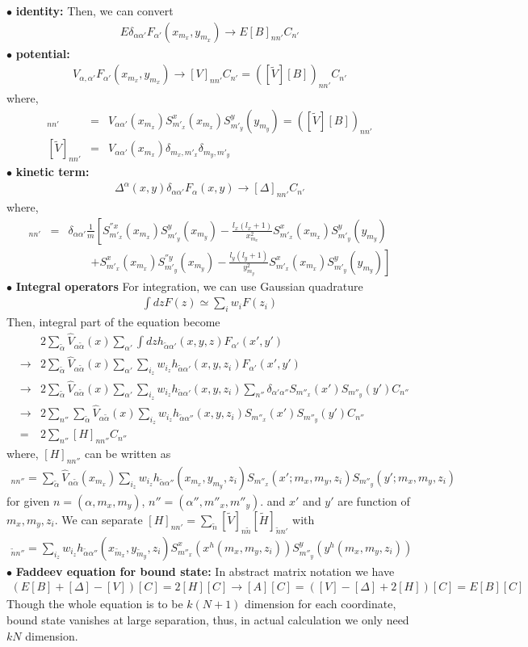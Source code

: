 \documentclass[11pt]{article}
\newcommand{\bea}{\begin{eqnarray}}
\newcommand{\eea}{\end{eqnarray}}
\newcommand{\no}{\nonumber \\}
\begin{document}
$\bullet$ {\bf identity:}
Then, we can convert
\bea
E\delta_{\alpha\alpha'} F_{\alpha'}(x_{m_x},y_{m_x})
\to E[B]_{nn'}C_{n'}
\eea
$\bullet$ {\bf potential:}
\bea
V_{\alpha,\alpha'}F_{\alpha'}(x_{m_x},y_{m_x})
\to [V]_{nn'} C_{n'}=([\tilde{V}][B])_{nn'}C_{n'}
\eea
where,
\bea
[V]_{nn'}&=&V_{\alpha\alpha'}(x_{m_x})
          S^x_{m'_x}(x_{m_x})S^y_{m'_y}(y_{m_y})
          =([\tilde{V}][B])_{nn'}\no
\left[\tilde{V}\right]_{nn'}&=&
          V_{\alpha\alpha'}(x_{m_x})
          \delta_{m_x,m'_x}\delta_{m_y,m'_y}
\eea
$\bullet$ {\bf kinetic term:}
\bea
\Delta^{\alpha}(x,y)\delta_{\alpha\alpha'}F_{\alpha}(x,y)
\to [\Delta]_{nn'} C_{n'}
\eea
where,
\bea
[\Delta]_{nn'}&=&\delta_{\alpha\alpha'}
                 \frac{1}{m}
             \left[S^{''x}_{m'_x}(x_{m_x})S^y_{m'_y}(x_{m_y})
            -\frac{l_x(l_x+1)}{x_{m_x}^2}
              S^{x}_{m'_x}(x_{m_x})S^y_{m'_y}(y_{m_y})\right.
              \no & &\qquad \left.
            +S^{x}_{m'_x}(x_{m_x})S^{''y}_{m'_y}(x_{m_y})
            -\frac{l_y(l_y+1)}{y_{m_y}^2}
              S^{x}_{m'_x}(x_{m_x})S^y_{m'_y}(y_{m_y}) 
             \right]     
\eea
$\bullet$ {\bf Integral operators}
For integration, we can use Gaussian quadrature
\bea
\int dz F(z)\simeq \sum_{i} w_i F(z_i)
\eea
Then, integral part of the equation become
\bea
& &2\sum_{\tilde{\alpha}}\hat{V}_{\alpha\tilde{\alpha}}(x)
\sum_{\alpha'}
\int dz h_{\tilde{\alpha}\alpha'}(x,y,z)F_{\alpha'}(x',y')\no
&\to& 2\sum_{\tilde{\alpha}}\hat{V}_{\alpha\tilde{\alpha}}(x)
\sum_{\alpha'}
\sum_{i_z} w_{i_z} h_{\tilde{\alpha}\alpha'}(x,y,z_i)
                   F_{\alpha'}(x',y')\no
&\to&2\sum_{\tilde{\alpha}}\hat{V}_{\alpha\tilde{\alpha}}(x)
\sum_{\alpha'}
\sum_{i_z} w_{i_z} h_{\tilde{\alpha}\alpha'}(x,y,z_i)
            \sum_{n''} \delta_{\alpha'\alpha''}
            S_{m''_x}(x')S_{m''_y}(y')C_{n''}   \no
&\to&2\sum_{n''}
\sum_{\tilde{\alpha}}\hat{V}_{\alpha\tilde{\alpha}}(x)
\sum_{i_z} w_{i_z} h_{\tilde{\alpha}\alpha''}(x,y,z_i)             
            S_{m''_x}(x')S_{m''_y}(y')C_{n''}   \no            
&=&2\sum_{n''}[H]_{n n''}C_{n''}    
\eea
where, $[H]_{n n''}$ can be written as
\bea
[H]_{nn''}=\sum_{\tilde{\alpha}}\hat{V}_{\alpha\tilde{\alpha}}(x_{m_x})
\sum_{i_z} w_{i_z} h_{\tilde{\alpha}\alpha''}(x_{m_x},y_{m_y},z_i) 
            S_{m''_x}(x';m_x,m_y,z_i)S_{m''_y}(y';m_x,m_y,z_i)
\eea
for given $n=(\alpha,m_x,m_y)$, $n''=(\alpha'',m''_x,m''_y)$.
and $x'$ and $y'$ are function of $m_x,m_y,z_i$.
We can separate $[H]_{n n'}=\sum_{\tilde{n}}
[\tilde{V}]_{n\tilde{n}}[\tilde{H}]_{\tilde{n}n'}$
with
\bea
[\tilde{H}]_{\tilde{n}n''}
=\sum_{i_z}w_{i_z} 
 h_{\tilde{\alpha}\alpha''}(x_{\tilde{m}_x},y_{\tilde{m}_y},z_i)
 S^x_{m''_x}(x^h(m_x,m_y,z_i))
 S^y_{m''_y}(y^h(m_x,m_y,z_i))
\eea
$\bullet$ {\bf Faddeev equation for bound state:} In abstract matrix notation we have
\bea
(E[B]+[\Delta]-[V])[C]=2[H][C]
\to [A][C]=([V]-[\Delta]+2[H])[C]=E[B][C]
\eea
Though the whole equation is to be $k(N+1)$ dimension 
for each coordinate, bound state vanishes at large separation,
thus, in actual calculation we only need $kN$ dimension.
\end{document}
